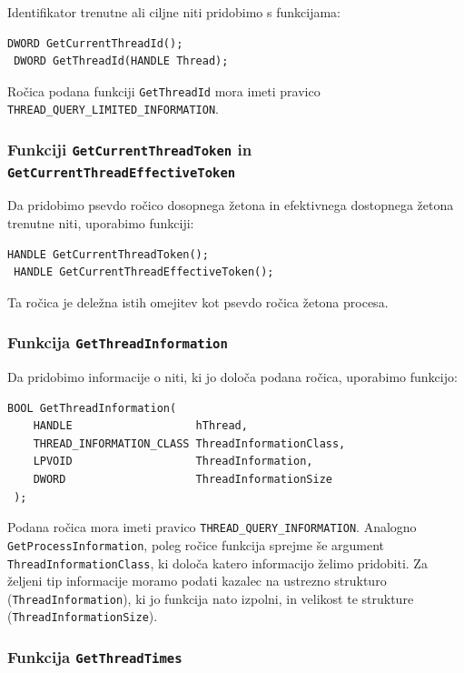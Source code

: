 \documentclass[a4paper,12pt,openright]{book}
\begin{document}
Identifikator trenutne ali ciljne niti pridobimo s funkcijama:
\begin{lstlisting}[style=func]
 DWORD GetCurrentThreadId();
 DWORD GetThreadId(HANDLE Thread);
\end{lstlisting}

Ročica podana funkciji \texttt{GetThreadId} mora imeti pravico \texttt{THREAD\_QUERY\-\_LIMITED\-\_INFORMATION}.

\subsubsection{Funkciji \texttt{GetCurrentThreadToken} in \texttt{GetCurrentThreadEffectiveToken}}

Da pridobimo psevdo ročico dosopnega žetona in efektivnega dostopnega žetona trenutne niti, uporabimo funkciji:
\begin{lstlisting}[style=func]
 HANDLE GetCurrentThreadToken();
 HANDLE GetCurrentThreadEffectiveToken();
\end{lstlisting}

Ta ročica je deležna istih omejitev kot psevdo ročica žetona procesa.

\subsubsection{Funkcija \texttt{GetThreadInformation}}

Da pridobimo informacije o niti, ki jo določa podana ročica, uporabimo funkcijo:
\begin{lstlisting}[style=func]
 BOOL GetThreadInformation(
	HANDLE                   hThread,
	THREAD_INFORMATION_CLASS ThreadInformationClass,
	LPVOID                   ThreadInformation,
	DWORD                    ThreadInformationSize
 );
\end{lstlisting}

Podana ročica mora imeti pravico \texttt{THREAD\-\_QUERY\_INFORMATION}.
Analogno \texttt{GetProcessInformation}, poleg ročice funkcija sprejme še argument \texttt{ThreadInformationClass}, ki določa katero informacijo želimo pridobiti.
Za željeni tip informacije moramo podati kazalec na ustrezno strukturo (\texttt{Thread\-Information}), ki jo funkcija nato izpolni, in velikost te strukture (\texttt{Thread\-InformationSize}).

\subsubsection{Funkcija \texttt{GetThreadTimes}}
\end{document}
